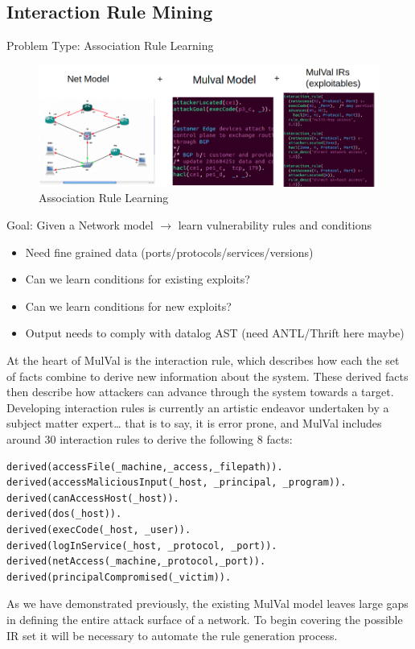 \subsection{Interaction Rule Mining}


Problem Type: Association Rule Learning


\begin{figure}[ht]
\centering
\includegraphics[width=.9\textwidth]{resource/img/ch_future/rule_learning.png}
\caption{Association Rule Learning}
\label{fig:final:learn_rule}
\end{figure} 

Goal: Given a Network model $\longrightarrow$ learn vulnerability rules and conditions
\begin{itemize}
\item Need fine grained data (ports/protocols/services/versions)
\item Can we learn conditions for existing exploits?
\item Can we learn conditions for new exploits?
\item Output needs to comply with datalog AST (need ANTL/Thrift here maybe)
\end{itemize}

At the heart of MulVal is the interaction rule, which describes how each the set of facts combine to derive new information about the system. These derived facts then describe how attackers can advance through the system towards a target. Developing interaction rules is currently an artistic endeavor undertaken by a subject matter expert… that is to say, it is error prone, and MulVal includes around 30 interaction rules to derive the following 8 facts:

\begin{lstlisting}[style=datalog, label={lst:fut:facts}, caption={Mulval Derived Facts}]
derived(accessFile(_machine,_access,_filepath)).
derived(accessMaliciousInput(_host, _principal, _program)).
derived(canAccessHost(_host)).
derived(dos(_host)).
derived(execCode(_host, _user)).
derived(logInService(_host, _protocol, _port)).
derived(netAccess(_machine,_protocol,_port)).
derived(principalCompromised(_victim)).
\end{lstlisting}
As we have demonstrated previously, the existing MulVal model leaves large gaps in defining the entire attack surface of a network. To begin covering the possible IR set it will be necessary to automate the rule generation process.

